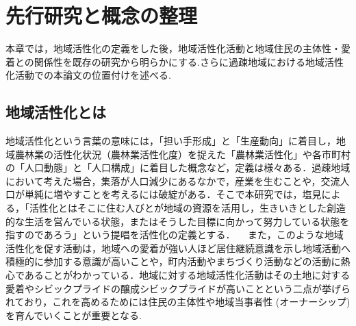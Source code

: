 \documentclass[a4paper]{jsarticle}
\begin{document}
\newpage

\section{先行研究と概念の整理}
本章では，地域活性化の定義をした後，地域活性化活動と地域住民の主体性・愛着との関係性を既存の研究から明らかにする.さらに過疎地域における地域活性化活動での本論文の位置付けを述べる.
\subsection{地域活性化とは}
地域活性化という言葉の意味には，「担い手形成」と「生産動向」に着目し，地域農林業の活性化状況（農林業活性化度）を捉えた「農林業活性化」や各市町村の「人口動態」と「人口構成」に着目した概念など，定義は様々ある．過疎地域において考えた場合，集落が人口減少にあるなかで，産業を生むことや，交流人口が単純に増やすことを考えるには破綻がある．そこで本研究では，塩見による，「活性化とはそこに住む人びとが地域の資源を活用し，生きいきとした創造的な生活を営んでいる状態，またはそうした目標に向かって努力している状態を指すのであろう」という提唱を活性化の定義とする．
　また，このような地域活性化を促す活動は，地域への愛着が強い人ほど居住継続意識を示し地域活動へ積極的に参加する意識が高いことや，町内活動やまちづくり活動などの活動に熱心であること\cite{8}がわかっている．地域に対する地域活性化活動はその土地に対する愛着やシビックプライドの醸成シビックプライドが高いことという二点が挙げられており，これを高めるためには住民の主体性や地域当事者性 (オーナーシップ) を育んでいくことが重要となる.
\end{document}
